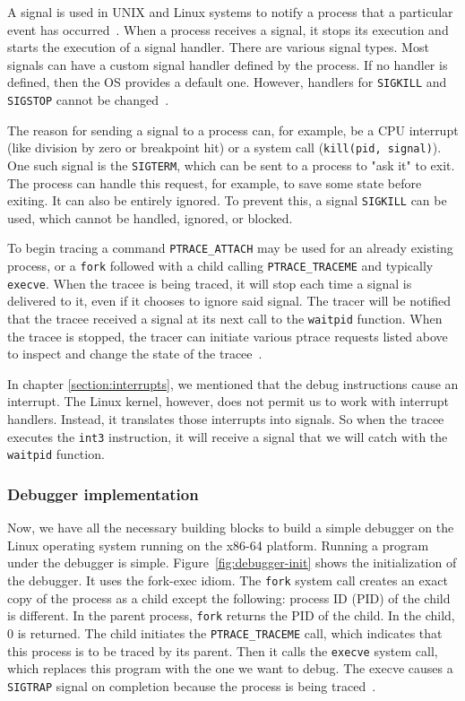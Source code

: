 A signal is used in UNIX and Linux systems to notify a process that a
particular event has occurred~\cite{os-concepts}. When a process receives a
signal, it stops its execution and starts the execution of a signal handler.
There are various signal types. Most signals can have a custom signal handler
defined by the process. If no handler is defined, then the OS provides a
default one. However, handlers for \texttt{SIGKILL} and \texttt{SIGSTOP} cannot
be changed~\cite{signals}.

The reason for sending a signal to a process can, for example, be a CPU
interrupt (like division by zero or breakpoint hit) or a system call
(\texttt{kill(pid, signal)}). One such signal is the \texttt{SIGTERM}, which
can be sent to a process to "ask it" to exit. The process can handle this
request, for example, to save some state before exiting. It can also be
entirely ignored. To prevent this, a signal \texttt{SIGKILL} can be used, which
cannot be handled, ignored, or blocked.

To begin tracing a command \texttt{PTRACE\_ATTACH} may be used for an already
existing process, or a \texttt{fork} followed with a child calling
\texttt{PTRACE\_TRACEME} and typically \texttt{execve}. When the tracee is
being traced, it will stop each time a signal is delivered to it, even if it
chooses to ignore said signal. The tracer will be notified that the tracee
received a signal at its next call to the \texttt{waitpid} function. When the
tracee is stopped, the tracer can initiate various ptrace requests listed above
to inspect and change the state of the tracee~\cite{ptrace}.

In chapter \ref{section:interrupts}, we mentioned that the debug instructions
cause an interrupt. The Linux kernel, however, does not permit us to work with
interrupt handlers. Instead, it translates those interrupts into signals. So
when the tracee executes the \texttt{int3} instruction, it will receive a
signal that we will catch with the \texttt{waitpid} function.

\subsubsection{Debugger implementation}
Now, we have all the necessary building blocks to build a simple debugger on
the Linux operating system running on the x86-64 platform. Running a program
under the debugger is simple. Figure~\ref{fig:debugger-init} shows the
initialization of the debugger. It uses the fork-exec idiom. The \texttt{fork}
system call creates an exact copy of the process as a child except the
following: process ID (PID) of the child is different. In the parent process,
\texttt{fork} returns the PID of the child. In the child, $0$ is returned. The
child initiates the \texttt{PTRACE\_TRACEME} call, which indicates that this
process is to be traced by its parent. Then it calls the \texttt{execve} system
call, which replaces this program with the one we want to debug. The execve
causes a \texttt{SIGTRAP} signal on completion because the process is being
traced~\cite{execve}.


